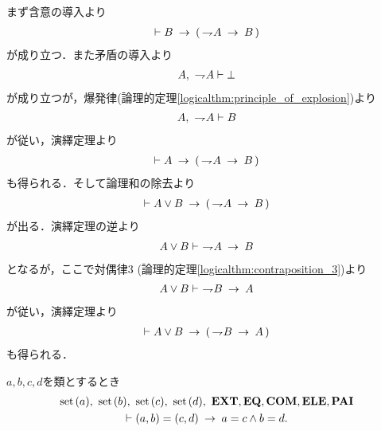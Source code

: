 	\begin{sketch}
		まず含意の導入より
		\begin{align}
			\vdash B \hspace{0.25em}\rightarrow\hspace{0.25em} (\, \rightharpoondown\hspace{-0.25em} A \hspace{0.25em}\rightarrow\hspace{0.25em} B\, )
		\end{align}
		が成り立つ．また矛盾の導入より
		\begin{align}
			A,\ \rightharpoondown\hspace{-0.25em} A \vdash \bot
		\end{align}
		が成り立つが，爆発律(論理的定理\ref{logicalthm:principle_of_explosion})より
		\begin{align}
			A,\ \rightharpoondown\hspace{-0.25em} A \vdash B
		\end{align}
		が従い，演繹定理より
		\begin{align}
			\vdash A \hspace{0.25em}\rightarrow\hspace{0.25em} (\, \rightharpoondown\hspace{-0.25em} A \hspace{0.25em}\rightarrow\hspace{0.25em} B\, )
		\end{align}
		も得られる．そして論理和の除去より
		\begin{align}
			\vdash A \vee B \hspace{0.25em}\rightarrow\hspace{0.25em} (\, \rightharpoondown\hspace{-0.25em} A \hspace{0.25em}\rightarrow\hspace{0.25em} B\, )
		\end{align}
		が出る．演繹定理の逆より
		\begin{align}
			A \vee B \vdash\ \rightharpoondown\hspace{-0.25em} A \hspace{0.25em}\rightarrow\hspace{0.25em} B
		\end{align}
		となるが，ここで対偶律$3$ (論理的定理\ref{logicalthm:contraposition_3})より
		\begin{align}
			A \vee B \vdash\ \rightharpoondown\hspace{-0.25em} B \hspace{0.25em}\rightarrow\hspace{0.25em} A
		\end{align}
		が従い，演繹定理より
		\begin{align}
			\vdash A \vee B \hspace{0.25em}\rightarrow\hspace{0.25em} (\, \rightharpoondown\hspace{-0.25em} B \hspace{0.25em}\rightarrow\hspace{0.25em} A\, )
		\end{align}
		も得られる．
		\QED
	\end{sketch}
	
	\begin{screen}
		\begin{thm}[順序対の相等性]
		\label{thm:equality_of_ordered_pairs}
			$a,b,c,d$を類とするとき
			\begin{align}
				\begin{gathered}
					\set{a},\ \set{b},\ \set{c},\ \set{d},\ \EXTAX,\EQAX,\COMAX,\ELEAX,\PAIAX \\
					\vdash (a,b) = (c,d) \rarrow a = c \wedge b = d.
				\end{gathered}
			\end{align}
		\end{thm}
	\end{screen}
	
